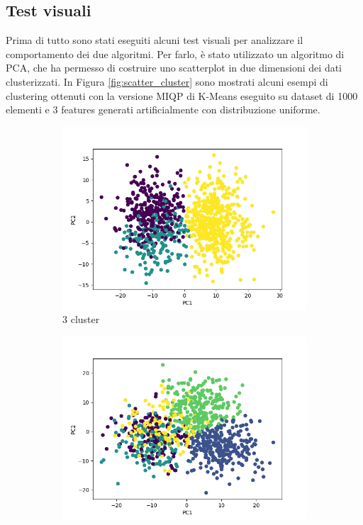 \documentclass{article}
\begin{document}
    \subsection{Test visuali}
    Prima di tutto sono stati eseguiti alcuni test visuali per analizzare il comportamento dei due algoritmi. Per farlo, è stato utilizzato un algoritmo di PCA, che ha permesso di costruire uno scatterplot in due dimensioni dei dati clusterizzati. In Figura \ref{fig:scatter_cluster} sono mostrati alcuni esempi di clustering ottenuti con la versione MIQP di K-Means eseguito su dataset di 1000 elementi e 3 features generati artificialmente con distribuzione uniforme.
    \begin{figure}[h]
     \centering
     \begin{subfigure}[b]{0.32\linewidth}
         \centering
         \includegraphics[width=\linewidth]{../results/plots/scatter_k3}
         \caption{3 cluster}
     \end{subfigure}
     \hfill
     \begin{subfigure}[b]{0.32\linewidth}
         \centering
         \includegraphics[width=\linewidth]{../results/plots/scatter_k5}

\end{subfigure}
\end{figure}
\end{document}
